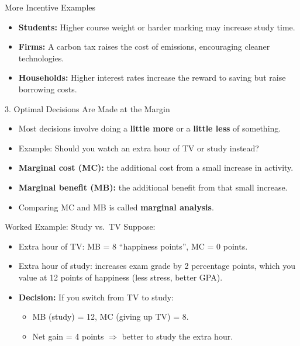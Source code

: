 \documentclass[aspectratio=169]{beamer}
\begin{document}
\begin{frame}{More Incentive Examples}
\transfade
\begin{itemize}[<+->]
  \item \textbf{Students:} Higher course weight or harder marking may increase study time.
  \item \textbf{Firms:} A carbon tax raises the cost of emissions, encouraging cleaner technologies.
  \item \textbf{Households:} Higher interest rates increase the reward to saving but raise borrowing costs.
\end{itemize}
\end{frame}

\begin{frame}{3. Optimal Decisions Are Made at the Margin}
\transfade
\begin{itemize}[<+->]
  \item Most decisions involve doing a \textbf{little more} or a \textbf{little less} of something.
  \item Example: Should you watch an extra hour of TV or study instead?
  \item \textbf{Marginal cost (MC):} the additional cost from a small increase in activity.
  \item \textbf{Marginal benefit (MB):} the additional benefit from that small increase.
  \item Comparing MC and MB is called \textbf{marginal analysis}.
\end{itemize}
\end{frame}

\begin{frame}{Worked Example: Study vs.\ TV}
\transfade
\small
Suppose:
\begin{itemize}[<+->]
  \item Extra hour of TV: MB = 8 ``happiness points'', MC = 0 points.
  \item Extra hour of study: increases exam grade by 2 percentage points, which you value at 12 points of happiness (less stress, better GPA).
  \item \textbf{Decision:} If you switch from TV to study:
  \begin{itemize}[<+->]
    \item MB (study) = 12, MC (giving up TV) = 8.
    \item Net gain = 4 points \(\Rightarrow\) better to study the extra hour.
  \end{itemize}
\end{itemize}
\end{frame}
\end{document}

